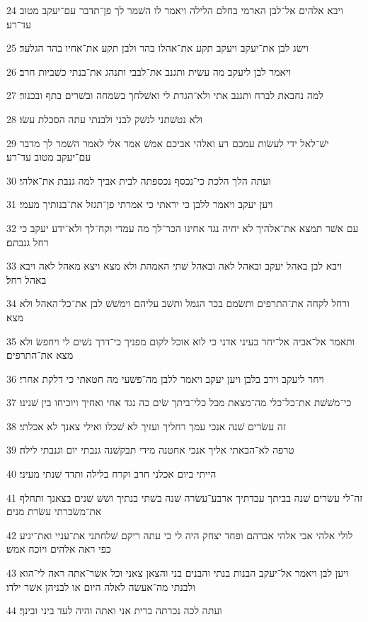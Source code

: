 \par 24 ויבא אלהים אל־לבן הארמי בחלם הלילה ויאמר לו השׁמר לך פן־תדבר עם־יעקב מטוב עד־רע׃
\par 25 וישׂג לבן את־יעקב ויעקב תקע את־אהלו בהר ולבן תקע את־אחיו בהר הגלעד׃
\par 26 ויאמר לבן ליעקב מה עשׂית ותגנב את־לבבי ותנהג את־בנתי כשׁביות חרב׃
\par 27 למה נחבאת לברח ותגנב אתי ולא־הגדת לי ואשׁלחך בשׂמחה ובשׁרים בתף ובכנור׃
\par 28 ולא נטשׁתני לנשׁק לבני ולבנתי עתה הסכלת עשׂו׃
\par 29 ישׁ־לאל ידי לעשׂות עמכם רע ואלהי אביכם אמשׁ אמר אלי לאמר השׁמר לך מדבר עם־יעקב מטוב עד־רע׃
\par 30 ועתה הלך הלכת כי־נכסף נכספתה לבית אביך למה גנבת את־אלהי׃
\par 31 ויען יעקב ויאמר ללבן כי יראתי כי אמרתי פן־תגזל את־בנותיך מעמי׃
\par 32 עם אשׁר תמצא את־אלהיך לא יחיה נגד אחינו הכר־לך מה עמדי וקח־לך ולא־ידע יעקב כי רחל גנבתם׃
\par 33 ויבא לבן באהל יעקב ובאהל לאה ובאהל שׁתי האמהת ולא מצא ויצא מאהל לאה ויבא באהל רחל׃
\par 34 ורחל לקחה את־התרפים ותשׂמם בכר הגמל ותשׁב עליהם וימשׁשׁ לבן את־כל־האהל ולא מצא׃
\par 35 ותאמר אל־אביה אל־יחר בעיני אדני כי לוא אוכל לקום מפניך כי־דרך נשׁים לי ויחפשׂ ולא מצא את־התרפים׃
\par 36 ויחר ליעקב וירב בלבן ויען יעקב ויאמר ללבן מה־פשׁעי מה חטאתי כי דלקת אחרי׃
\par 37 כי־משׁשׁת את־כל־כלי מה־מצאת מכל כלי־ביתך שׂים כה נגד אחי ואחיך ויוכיחו בין שׁנינו׃
\par 38 זה עשׂרים שׁנה אנכי עמך רחליך ועזיך לא שׁכלו ואילי צאנך לא אכלתי׃
\par 39 טרפה לא־הבאתי אליך אנכי אחטנה מידי תבקשׁנה גנבתי יום וגנבתי לילה׃
\par 40 הייתי ביום אכלני חרב וקרח בלילה ותדד שׁנתי מעיני׃
\par 41 זה־לי עשׂרים שׁנה בביתך עבדתיך ארבע־עשׂרה שׁנה בשׁתי בנתיך ושׁשׁ שׁנים בצאנך ותחלף את־משׂכרתי עשׂרת מנים׃
\par 42 לולי אלהי אבי אלהי אברהם ופחד יצחק היה לי כי עתה ריקם שׁלחתני את־עניי ואת־יגיע כפי ראה אלהים ויוכח אמשׁ׃
\par 43 ויען לבן ויאמר אל־יעקב הבנות בנתי והבנים בני והצאן צאני וכל אשׁר־אתה ראה לי־הוא ולבנתי מה־אעשׂה לאלה היום או לבניהן אשׁר ילדו׃
\par 44 ועתה לכה נכרתה ברית אני ואתה והיה לעד ביני ובינך׃
